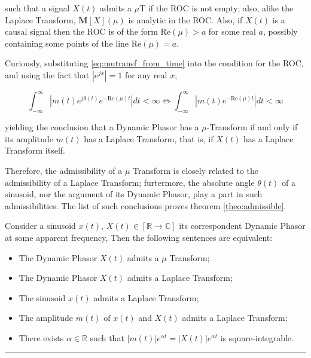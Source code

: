 	\noindent such that a signal $X(t)$ admits a $\mu$T if the ROC is not empty; also, alike the Laplace Transform, $\mathbf{M}\left[X\right]\left(\mu\right)$ is analytic in the ROC. Also, if $X(t)$ is a causal signal then the ROC is of the form $\text{Re}\left(\mu\right) > a$ for some real $a$, possibly containing some points of the line $\text{Re}\left(\mu\right) = a$.

	Curiously, substituting \eqref{eq:mutransf_from_time} into the condition for the ROC, and using the fact that $\left\lvert e^{jx}\right\rvert = 1$ for any real $x$,

\begin{equation} \int_{-\infty}^{\infty} \left\lvert m(t)e^{j\theta(t)} e^{-\text{Re}\left(\mu\right) t}\right\rvert dt < \infty \Leftrightarrow \int_{-\infty}^{\infty} \left\lvert m(t) e^{-\text{Re}\left(\mu\right) t}\right\rvert dt < \infty \end{equation}

	\noindent yielding the conclusion that a Dynamic Phasor has a $\mu$-Transform if and only if its amplitude $m(t)$ has a Laplace Transform, that is, if $X(t)$ has a Laplace Transform itself.

	Therefore, the admissibility of a $\mu$ Transform is closely related to the admissibility of a Laplace Transform; furtermore, the absolute angle $\theta(t)$ of a sinusoid, nor the argument of its Dynamic Phasor, play a part in such admissibilities. The list of such conclusions proves theorem \ref{theo:admissible}.

\begin{theorem}\label{theo:admissible} Consider a sinusoid $x(t)$, $X(t)\in\left[\mathbb{R}\to\mathbb{C}\right]$ its correspondent Dynamic Phasor at some apparent frequency, Then the following sentences are equivalent:

\begin{itemize}
	\item The Dynamic Phasor $X(t)$ admits a $\mu$ Transform;
	\item The Dynamic Phasor $X(t)$ admits a Laplace Transform;
	\item The sinusoid $x(t)$ admits a Laplace Transform;
	\item The amplitude $m(t)$ of $x(t)$ and $X(t)$ admits a Laplace Transform;
	\item There exists $\alpha\in\mathbb{R}$ such that $\left\lvert m(t)\right\rvert e^{\alpha t} = \left\lvert X(t)\right\rvert e^{\alpha t}$ is square-integrable.
\end{itemize}

\end{theorem}\hrule\vspace{3mm}

